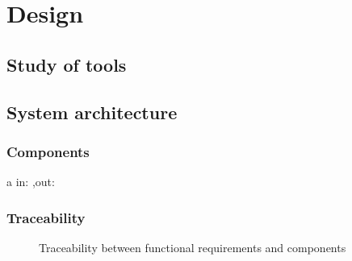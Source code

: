 \chapter{Design}\label{chap:design}

\section{Study of tools}\label{sec:study}








\section{System architecture}\label{sec:architecture}

\subsection{Components}


\begin{component}{a}
  {}  %
  {}  %
  {}  %
  {in: ,out: }  %
  {}  %
\end{component}

\FloatBarrier  %







\subsection{Traceability}\label{subsec:comp-traceability}

\begin{figure}[h]
  \label{tab:traceability-comp-fc}
  \centering
  \caption{Traceability between functional requirements and components}
\end{figure}